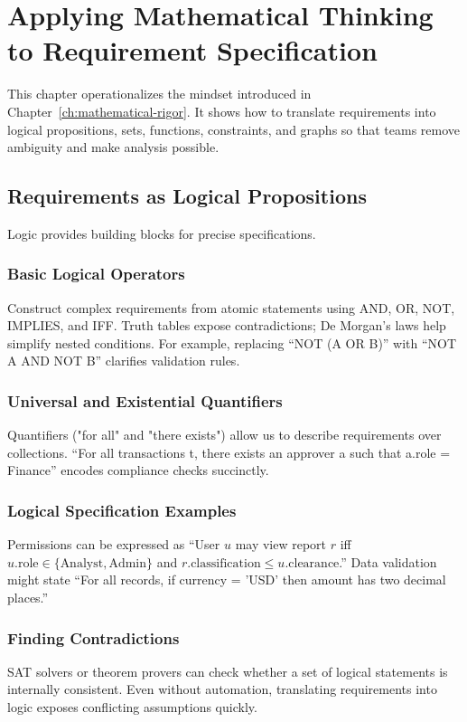 \chapter{Applying Mathematical Thinking to Requirement Specification}
\label{ch:requirement-specification}

This chapter operationalizes the mindset introduced in Chapter~\ref{ch:mathematical-rigor}. It shows how to translate requirements into logical propositions, sets, functions, constraints, and graphs so that teams remove ambiguity and make analysis possible.

\section{Requirements as Logical Propositions}
\label{sec:logical-propositions}

Logic provides building blocks for precise specifications.

\subsection{Basic Logical Operators}
Construct complex requirements from atomic statements using AND, OR, NOT, IMPLIES, and IFF. Truth tables expose contradictions; De Morgan's laws help simplify nested conditions. For example, replacing ``NOT (A OR B)'' with ``NOT A AND NOT B'' clarifies validation rules.

\subsection{Universal and Existential Quantifiers}
Quantifiers ("for all" and "there exists") allow us to describe requirements over collections. ``For all transactions t, there exists an approver a such that a.role = Finance'' encodes compliance checks succinctly.

\subsection{Logical Specification Examples}
Permissions can be expressed as ``User $u$ may view report $r$ iff $u.\text{role} \in \{\text{Analyst}, \text{Admin}\}$ and $r.\text{classification} \le u.\text{clearance}$.'' Data validation might state ``For all records, if currency = 'USD' then amount has two decimal places.''

\subsection{Finding Contradictions}
SAT solvers or theorem provers can check whether a set of logical statements is internally consistent. Even without automation, translating requirements into logic exposes conflicting assumptions quickly.

